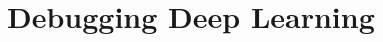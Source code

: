 \documentclass[10pt,mathserif]{beamer}
\begin{document}




\section{Debugging Deep Learning}
\end{document}
